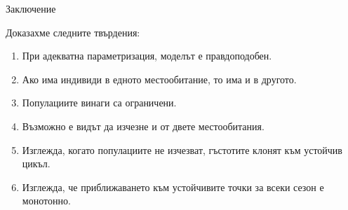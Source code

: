 \begin{frame}[t]{Заключение}

  Доказахме следните твърдения:
  \begin{enumerate}
    \item При адекватна параметризация, моделът е правдоподобен.
    \item Ако има индивиди в едното местообитание, то има и в другото.
    \item Популациите винаги са ограничени.
    \item Възможно е видът да изчезне и от двете местообитания.
    \item Изглежда, когато популациите не изчезват, гъстотите клонят към устойчив цикъл.
    \item Изглежда, че приближаването към устойчивите точки за всеки сезон е монотонно.

  \end{enumerate}

\end{frame}

